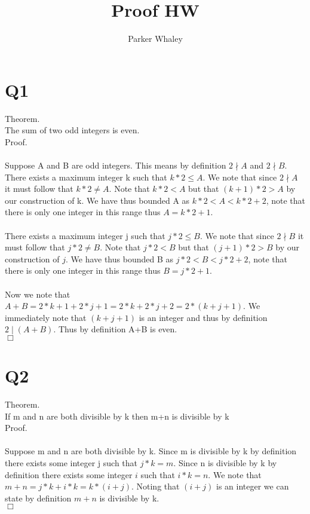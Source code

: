 \documentclass[12pt,a4paper]{article}
\author{Parker Whaley}
\title{Proof HW}
\begin{document}
\maketitle

\section{Q1}
Theorem.\\
The sum of two odd integers is even.\\
Proof.\\\\
Suppose A and B are odd integers.  This means by definition $2\nmid A$ and $2\nmid B$.  There exists a maximum integer k such that $k*2\le A$.  We note that since $2\nmid A$ it must follow that $k*2\neq A$.  Note that $k*2< A$ but that $(k+1)*2>A$ by our construction of k.  We have thus bounded A as $k*2<A<k*2+2$, note that there is only one integer in this range thus $A=k*2+1$.\\\\
There exists a maximum integer j such that $j*2\le B$.  We note that since $2\nmid B$ it must follow that $j*2\neq B$.  Note that $j*2< B$ but that $(j+1)*2>B$ by our construction of $j$.  We have thus bounded B as $j*2<B<j*2+2$, note that there is only one integer in this range thus $B=j*2+1$.\\\\
Now we note that $A+B=2*k+1+2*j+1=2*k+2*j+2=2*(k+j+1)$.  We immediately note that $(k+j+1)$ is an integer and thus by definition $2\mid (A+B)$.  Thus by definition A+B is even. \\
$\Box$
	
\section{Q2}
Theorem.\\
If m and n are both divisible by k then m+n is divisible by k\\
Proof.\\\\
Suppose m and n are both divisible by k.  Since m is divisible by k by definition there exists some integer j such that $j*k=m$.  Since n is divisible by k by definition there exists some integer $i$ such that $i*k=n$.  We note that $m+n=j*k+i*k=k*(i+j)$.  Noting that $(i+j)$ is an integer we can state by definition $m+n$ is divisible by k.\\
$\Box$
\end{document}
